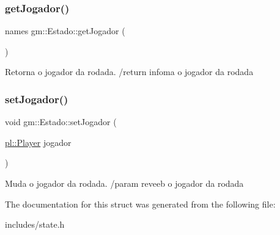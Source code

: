 \subsubsection{\texorpdfstring{get\+Jogador()}{getJogador()}}
{\footnotesize\ttfamily names gm\+::\+Estado\+::get\+Jogador (\begin{DoxyParamCaption}{ }\end{DoxyParamCaption})\hspace{0.3cm}{\ttfamily [inline]}}

Retorna o jogador da rodada. /return infoma o jogador da rodada \mbox{\label{structgm_1_1Estado_a8ee0f3264a4ca3c1c19176cf91b06376}} 
\subsubsection{\texorpdfstring{set\+Jogador()}{setJogador()}}
{\footnotesize\ttfamily void gm\+::\+Estado\+::set\+Jogador (\begin{DoxyParamCaption}\item[{\hyperlink{structpl_1_1Player}{pl\+::\+Player}}]{jogador }\end{DoxyParamCaption})\hspace{0.3cm}{\ttfamily [inline]}}

Muda o jogador da rodada. /param reveeb o jogador da rodada 

The documentation for this struct was generated from the following file\+:\begin{DoxyCompactItemize}
\item 
includes/state.\+h\end{DoxyCompactItemize}
